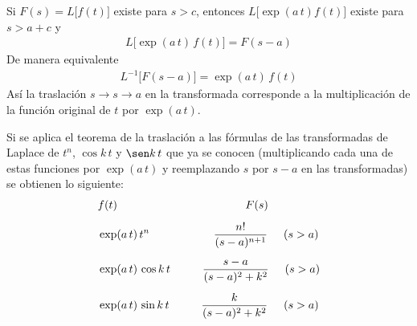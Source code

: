 \begin{teo}
Si $F(s) = L \big[f(t)\big]$ existe para $s > c$, entonces  $L \big[\exp(a \, t) f(t)\big]$ existe para $s > a + c$ y
\begin{align*}
L \big[\exp(a \, t) \, f(t) \big] = F(s - a)
\end{align*}
De manera equivalente
\begin{align*}
L^{-1} \big[F(s - a)\big] = \exp(a \, t) \, f(t)
\end{align*}
Así la traslación $s \to s \to a$ en la transformada corresponde a la multiplicación de la función original de $t$ por $\exp(a \, t)$.
\end{teo}
Si se aplica el teorema de la traslación a las fórmulas de las transformadas de Laplace de $t^{n}$, $\cos k \, t$ y $\sen k \, t$ que ya se conocen  (multiplicando cada una de estas funciones por $\exp(a \, t)$ y reemplazando $s$ por $s - a$ en las transformadas) se obtienen lo siguiente:
\begin{align}
&{} f(t) \hspace{4cm} F(s) \nonumber \\[0.5em]
&{} \exp(a \, t) \, t^{n} \hspace{2cm} \dfrac{n!}{(s - a)^{n+1}} \hspace{0.5cm} (s > a)  \label{eq:ecuacion_106 } \\[0.5em]
&{} \exp(a \, t) \, \cos k \, t \hspace{1cm} \dfrac{s - a}{(s - a)^{2} + k^{2}} \hspace{0.5cm} (s > a)  \label{eq:ecuacion_107 }\\[0.5em]
&{} \exp(a \, t) \, \sin k \, t \hspace{1cm} \dfrac{k}{(s - a)^{2} + k^{2}} \hspace{0.5cm} (s > a)  \label{eq:ecuacion_108 }
\end{align}
